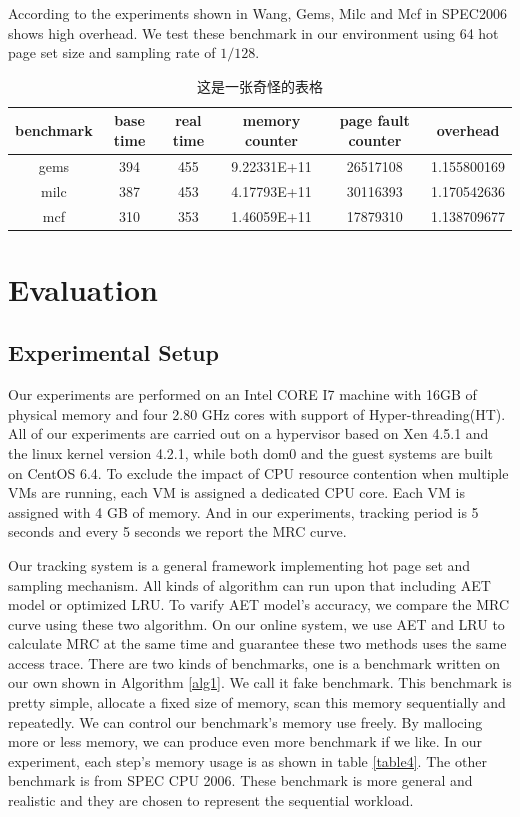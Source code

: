 \documentclass[10pt,twocolumn]{article}
\begin{document}
According to the experiments shown in Wang\cite{Wang2016Dynamic}, Gems, Milc and Mcf in SPEC2006 shows high overhead. We test these benchmark in our environment using 64 hot page set size and sampling rate of $1/128$.
\begin{table}
	\centering
	\caption{这是一张奇怪的表格}\label{tab:aStrangeTable}
	\begin{tabular}{cccccc}
		\toprule
		benchmark & base time & real time & memory counter & page fault counter & overhead \\
		\midrule
		gems & 394 & 455 & 9.22331E+11 & 26517108 & 1.155800169 \\
		milc & 387 & 453 & 4.17793E+11 & 30116393 & 1.170542636 \\
		mcf & 310 & 353 & 1.46059E+11 & 17879310 & 1.138709677 \\
		\bottomrule
	\end{tabular}
\end{table}

\section{Evaluation}
\subsection{Experimental Setup}
Our experiments are performed on an Intel CORE I7 machine with 16GB of physical memory and four 2.80 GHz cores with support of Hyper-threading(HT). All of our experiments are carried out on a hypervisor based on Xen 4.5.1 and the linux kernel version 4.2.1, while both dom0 and the guest systems are built on CentOS 6.4. To exclude the impact of CPU resource contention when multiple VMs are running, each VM is assigned a dedicated CPU core. Each VM is assigned with 4 GB of memory. And in our experiments, tracking period is 5 seconds and every 5 seconds we report the MRC curve.

Our tracking system is a general framework implementing hot page set and sampling mechanism. All kinds of algorithm can run upon that including AET model or optimized LRU. To varify AET model's accuracy, we compare the MRC curve using these two algorithm. On our online system, we use AET and LRU to calculate MRC at the same time and guarantee these two methods uses the same access trace. There are two kinds of benchmarks, one is a benchmark written on our own shown in Algorithm \ref{alg1}. We call it fake benchmark. This benchmark is pretty simple, allocate a fixed size of memory, scan this memory sequentially and repeatedly. We can control our benchmark's memory use freely. By mallocing more or less memory, we can produce even more benchmark if we like. In our experiment, each step's memory usage is as shown in table \ref{table4}. The other benchmark is from SPEC CPU 2006\cite{Henning2000spec}. These benchmark is more general and realistic and they are chosen to represent the sequential workload. 
\end{document}
